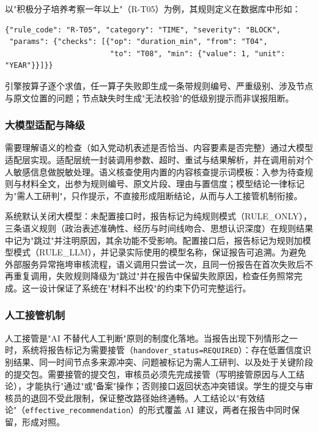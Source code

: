 \documentclass[12pt,a4paper]{ctexart}
\begin{document}
以"积极分子培养考察一年以上"（R-T05）为例，其规则定义在数据库中形如：

\begin{lstlisting}
{"rule_code": "R-T05", "category": "TIME", "severity": "BLOCK",
 "params": {"checks": [{"op": "duration_min", "from": "T04",
                        "to": "T08", "min": {"value": 1, "unit": "YEAR"}}]}}
\end{lstlisting}

引擎按算子逐个求值，任一算子失败即生成一条带规则编号、严重级别、涉及节点与原文位置的问题；节点缺失时生成"无法校验"的低级别提示而非误报阻断。

\subsubsection{大模型适配与降级}

需要理解语义的检查（如入党动机表述是否恰当、内容要素是否完整）通过大模型适配层实现。适配层统一封装调用参数、超时、重试与结果解析，并在调用前对个人敏感信息做脱敏处理。语义核查使用内置的内容核查提示词模板：入参为待查规则与材料全文，出参为规则编号、原文片段、理由与置信度；模型结论一律标记为"需人工研判"，只作提示，不直接形成阻断结论，从而与人工接管机制衔接。

系统默认关闭大模型：未配置接口时，报告标记为纯规则模式（RULE\_ONLY），三条语义规则（政治表述准确性、经历与时间线吻合、思想认识深度）在规则结果中记为"跳过"并注明原因，其余功能不受影响。配置接口后，报告标记为规则加模型模式（RULE\_LLM），并记录实际使用的模型名称，保证报告可追溯。为避免外部服务异常拖垮审核流程，语义调用只尝试一次，且同一份报告在首次失败后不再重复调用，失败规则降级为"跳过"并在报告中保留失败原因，检查任务照常完成。这一设计保证了系统在"材料不出校"的约束下仍可完整运行。

\subsubsection{人工接管机制}

人工接管是"AI 不替代人工判断"原则的制度化落地。当报告出现下列情形之一时，系统将报告标记为需要接管（\texttt{handover\_status=REQUIRED}）：存在低置信度识别结果、同一时间节点多来源冲突、问题被标记为需人工研判、以及处于关键阶段的提交包。需要接管的提交包，审核员必须先完成接管（写明接管原因与人工结论），才能执行"通过"或"备案"操作；否则接口返回状态冲突错误。学生的提交与审核员的退回不受此限制，保证整改路径始终通畅。人工结论以"有效结论"（\texttt{effective\_recommendation}）的形式覆盖 AI 建议，两者在报告中同时保留，形成对照。
\end{document}

